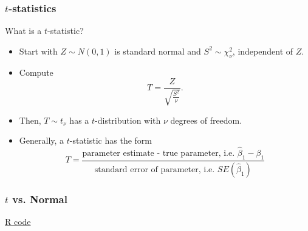 \documentclass[handout]{beamer}
\begin{document}

   \begin{frame} \frametitle{$t$-statistics}

   \begin{block}    {What is a $t$-statistic?}

   \begin{itemize}
   \item Start with $Z \sim N(0,1)$ is standard normal and $S^2 \sim \chi^2_{\nu}$, independent of $Z$.
   \item Compute
   $$
   T = \frac{Z}{\sqrt{\frac{S^2}{\nu}}}.$$

   \item Then,  $T \sim t_{\nu}$ has a $t$-distribution with $\nu$ degrees of freedom.


   \item Generally, a $t$-statistic has the form
   $$
   T = \frac{\text{parameter estimate - true parameter, i.e. $\widehat{\beta}_1-\beta_1$}}{\text{standard error of parameter, i.e. $SE(\widehat{\beta}_1)$}}$$
   \end{itemize}
   \end{block}
   \end{frame}



   \begin{frame}
   \frametitle{$t$ vs. Normal}
   \begin{center}
   \end{center}
   \href{http://stats191.stanford.edu/simple.html#density-of-a-random-variable}{R code}
   \end{frame}
\end{document}
